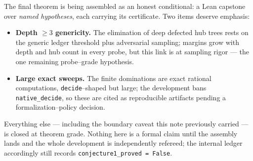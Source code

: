 \documentclass[11pt]{article}
\begin{document}
The final theorem is being assembled as an honest conditional: a Lean capstone over
\emph{named hypotheses}, each carrying its certificate. Two items deserve emphasis:
\begin{itemize}
\item[]\textbf{Depth $\ge3$ genericity.} The elimination of deep defected hub trees rests on the
generic ledger threshold plus adversarial sampling; margins grow with depth and hub count in every
probe, but this link is at sampling rigor --- the one remaining probe--grade hypothesis.
\item[]\textbf{Large exact sweeps.} The finite dominations are exact rational computations,
\texttt{decide}--shaped but large; the development bans \texttt{native\_decide}, so these are cited
as reproducible artifacts pending a formalization--policy decision.
\end{itemize}
Everything else --- including the boundary caveat this note previously carried --- is closed at
theorem grade. Nothing here is a formal claim until the assembly lands and the whole development is
independently refereed; the internal ledger accordingly still records
\texttt{conjecture1\_proved = False}.
\end{document}
